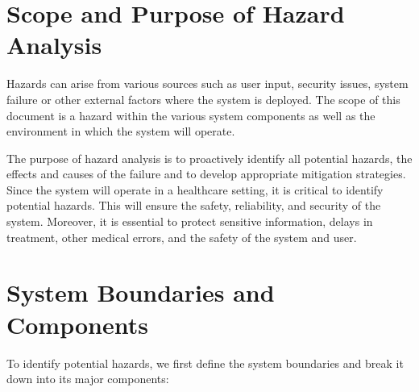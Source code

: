 \documentclass{article}
\begin{document}
\section{Scope and Purpose of Hazard Analysis}

Hazards can arise from various sources such as user input, security issues, system failure or other external factors where the system is deployed. The scope of this document is a hazard within the various system components as well as the environment in which the system will operate.

The purpose of hazard analysis is to proactively identify all potential hazards, the effects and causes of the failure and to develop appropriate mitigation strategies. Since the system will operate in a healthcare setting, it is critical to identify potential hazards. This will ensure the safety, reliability, and security of the system. Moreover, it is essential to protect sensitive information, delays in treatment, other medical errors, and the safety of the system and user. 

\section{System Boundaries and Components}

To identify potential hazards, we first define the system boundaries and break it down into its major components:
\end{document}
